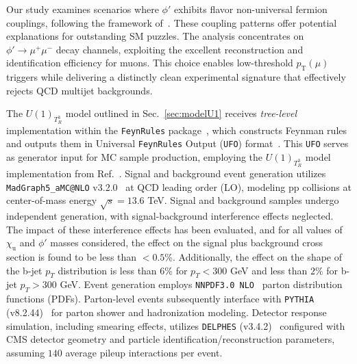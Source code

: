 Our study examines scenarios where $\phi'$ exhibits flavor non-universal fermion couplings, following the framework of~\parencite{Dutta2020}. These coupling patterns offer potential explanations for outstanding SM puzzles. The analysis concentrates on $\phi'\to\mu^+\mu^-$ decay channels, exploiting the excellent reconstruction and identification efficiency for muons. This choice enables low-threshold $p_{\mathrm{T}}(\mu)$ triggers while delivering a distinctly clean experimental signature that effectively rejects QCD multijet backgrounds.


The $U(1)_{T^3_R}$ model outlined in Sec.~\ref{sec:modelU1} receives \textit{tree-level} implementation within the \texttt{FeynRules} package~\parencite{Alloul:2013bka}, which constructs Feynman rules and outputs them in Universal \texttt{FeynRules} Output (\texttt{UFO}) format~\parencite{Degrande:2011ua}. This \texttt{UFO} serves as generator input for MC sample production, employing the $U(1)_{T^3_R}$ model implementation from Ref.~\parencite{Dutta2023}. Signal and background event generation utilizes \texttt{MadGraph5\_aMC@NLO} v3.2.0~\parencite{Alwall:2014hca,Alwall:2014bza} at QCD leading order (LO), modeling \textrm{pp} collisions at center-of-mass energy $\sqrt{s} = 13.6$ \textrm{TeV}. Signal and background samples undergo independent generation, with signal-background interference effects neglected. The impact of these interference effects has been evaluated, and for all values of $\chi_\mathrm{u}$ and $\phi'$ masses considered, the effect on the signal plus background cross section is found to be less than $<0.5$\%. Additionally, the effect on the shape of the b-jet $p_{T}$ distribution is less than $6$\% for $p_{T} < 300$ GeV and less than $2$\% for \textrm{b}-jet $p_{T} > 300$ GeV.
Event generation employs \texttt{NNPDF3.0~NLO}~\parencite{NNPDF:2014otw} parton distribution functions (PDFs). Parton-level events subsequently interface with \texttt{PYTHIA} (v8.2.44)~\parencite{Sjostrand:2014zea} for parton shower and hadronization modeling. Detector response simulation, including smearing effects, utilizes \texttt{DELPHES} (v3.4.2)~\parencite{deFavereau:2013fsa} configured with CMS detector geometry and particle identification/reconstruction parameters, assuming $140$ average pileup interactions per event.

